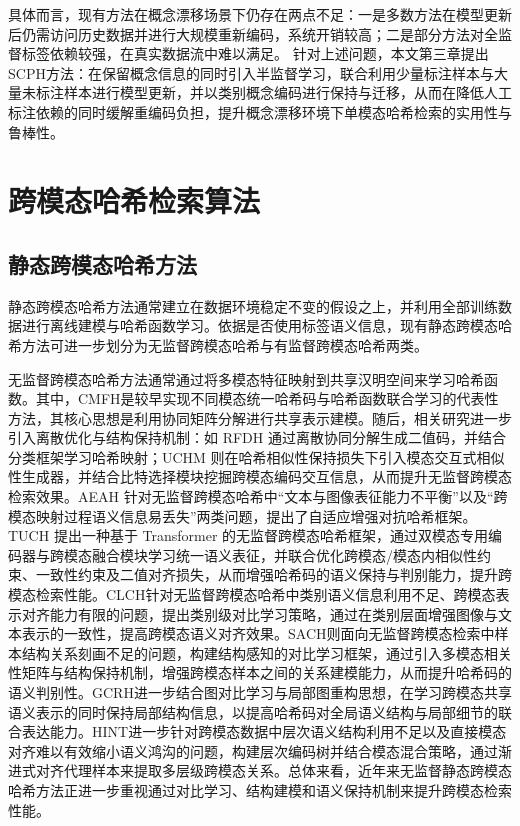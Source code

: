 具体而言，现有方法在概念漂移场景下仍存在两点不足：一是多数方法在模型更新后仍需访问历史数据并进行大规模重新编码，系统开销较高；二是部分方法对全监督标签依赖较强，在真实数据流中难以满足。
针对上述问题，本文第三章提出SCPH方法：在保留概念信息的同时引入半监督学习，联合利用少量标注样本与大量未标注样本进行模型更新，并以类别概念编码进行保持与迁移，从而在降低人工标注依赖的同时缓解重编码负担，提升概念漂移环境下单模态哈希检索的实用性与鲁棒性。

\section{跨模态哈希检索算法}
\subsection{静态跨模态哈希方法}
静态跨模态哈希方法通常建立在数据环境稳定不变的假设之上，并利用全部训练数据进行离线建模与哈希函数学习。依据是否使用标签语义信息，现有静态跨模态哈希方法可进一步划分为无监督跨模态哈希与有监督跨模态哈希两类。

无监督跨模态哈希方法通常通过将多模态特征映射到共享汉明空间来学习哈希函数。其中，CMFH是较早实现不同模态统一哈希码与哈希函数联合学习的代表性方法，其核心思想是利用协同矩阵分解进行共享表示建模。随后，相关研究进一步引入离散优化与结构保持机制：如 RFDH 通过离散协同分解生成二值码，并结合分类框架学习哈希映射；UCHM 则在哈希相似性保持损失下引入模态交互式相似性生成器，并结合比特选择模块挖掘跨模态编码交互信息，从而提升无监督跨模态检索效果。AEAH 针对无监督跨模态哈希中“文本与图像表征能力不平衡”以及“跨模态映射过程语义信息易丢失”两类问题，提出了自适应增强对抗哈希框架。TUCH 提出一种基于 Transformer 的无监督跨模态哈希框架，通过双模态专用编码器与跨模态融合模块学习统一语义表征，并联合优化跨模态/模态内相似性约束、一致性约束及二值对齐损失，从而增强哈希码的语义保持与判别能力，提升跨模态检索性能。CLCH针对无监督跨模态哈希中类别语义信息利用不足、跨模态表示对齐能力有限的问题，提出类别级对比学习策略，通过在类别层面增强图像与文本表示的一致性，提高跨模态语义对齐效果。SACH则面向无监督跨模态检索中样本结构关系刻画不足的问题，构建结构感知的对比学习框架，通过引入多模态相关性矩阵与结构保持机制，增强跨模态样本之间的关系建模能力，从而提升哈希码的语义判别性。GCRH进一步结合图对比学习与局部图重构思想，在学习跨模态共享语义表示的同时保持局部结构信息，以提高哈希码对全局语义结构与局部细节的联合表达能力。HINT进一步针对跨模态数据中层次语义结构利用不足以及直接模态对齐难以有效缩小语义鸿沟的问题，构建层次编码树并结合模态混合策略，通过渐进式对齐代理样本来提取多层级跨模态关系。总体来看，近年来无监督静态跨模态哈希方法正进一步重视通过对比学习、结构建模和语义保持机制来提升跨模态检索性能。

